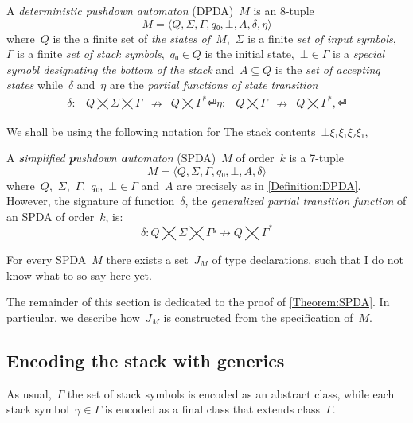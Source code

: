 \begin{Definition}
  \label{Definition:DPDA}
  A \emph{deterministic pushdown automaton} (DPDA)~$M$ is an 8-tuple
  \[
    M =⟨Q,Σ,Γ, q₀,⊥, A,δ,η⟩
  \]
  where~$Q$ is the a finite set of
  \emph{the states of~$M$},~$Σ$ is a finite
  \emph{set of input symbols},~$Γ$ is a finite
  \emph{set of stack symbols},~$q₀∈Q$ is the initial state,~$⊥∈Γ$
  is a \emph{special symobl designating the bottom of the stack}
  and~$A⊆Q$ is the \emph{set of accepting states} while~$δ$ and~$η$ are
  the \emph{partial functions of state transition}
  \[
    \begin{array}{crlc}
      δ: & Q⨉Σ⨉Γ &↛& Q⨉Γ^*⏎
      η: & Q⨉Γ &↛& Q⨉Γ^*,⏎
    \end{array}
  \]
\end{Definition}
We shall be using the following notation for
The stack contents~$⊥ξ₁ξ₁ξ₂ξ₁$,

\begin{Definition}
  \label{Definition:SPDA}
  A \emph{\textbf simplified \textbf pushdown \textbf automaton} (SPDA)~$M$ of order~$k$ is a 7-tuple
  \[
    M =⟨Q,Σ,Γ,q₀,⊥, A,δ⟩
  \]
  where~$Q$,~$Σ$,~$Γ$,~$q₀$,~$⊥∈Γ$ and~$A$ are precisely as in \cref{Definition:DPDA}.
  However, the signature of function~$δ$, the \emph{generalized partial transition function}
  of an SPDA of order~$k$, is:
  \begin{equation}
    \label{Equation:generalized:transition}
      δ: Q⨉Σ⨉Γᵏ↛Q⨉Γ^*
    \end{equation}
\end{Definition}

\begin{Theorem}
  \label{Theorem:SPDA}
  For every SPDA~$M$ there exists a set~$J_M$ of \Java type declarations, such that
    I do not know what to so say here yet.
\end{Theorem}

\begin{figure}[b]
  \begin{adjustbox}{max width=0.6\linewidth}
    
  \end{adjustbox}
\end{figure}

The remainder of this section is dedicated to the proof of \cref{Theorem:SPDA}.
In particular, we describe how~$J_M$ is constructed from the
  specification of~$M$.

\subsection{Encoding the stack with \Java generics}
As usual,~$Γ$ the set of stack symbols is encoded as an abstract class,
  while each stack symbol~$γ∈Γ$ is encoded as a final class that
  extends class~$Γ$.

